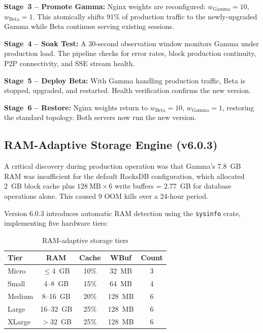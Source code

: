 \documentclass[11pt,a4paper,twocolumn]{article}
\begin{document}
\noindent\textbf{Stage~3 -- Promote Gamma:} Nginx weights are reconfigured:
$w_\text{Gamma} = 10$, $w_\text{Beta} = 1$. This atomically shifts 91\% of production
traffic to the newly-upgraded Gamma while Beta continues serving existing sessions.

\noindent\textbf{Stage~4 -- Soak Test:} A 30-second observation window monitors Gamma
under production load. The pipeline checks for error rates, block production continuity,
P2P connectivity, and SSE stream health.

\noindent\textbf{Stage~5 -- Deploy Beta:} With Gamma handling production traffic, Beta
is stopped, upgraded, and restarted. Health verification confirms the new version.

\noindent\textbf{Stage~6 -- Restore:} Nginx weights return to $w_\text{Beta} = 10$,
$w_\text{Gamma} = 1$, restoring the standard topology. Both servers now run the new
version.

\subsection{RAM-Adaptive Storage Engine (v6.0.3)}

A critical discovery during production operation was that Gamma's 7.8~GB RAM was
insufficient for the default RocksDB configuration, which allocated 2~GB block cache
plus $128~\text{MB} \times 6$ write buffers = 2.77~GB for database operations alone.
This caused 9 OOM kills over a 24-hour period.

Version 6.0.3 introduces automatic RAM detection using the \texttt{sysinfo} crate,
implementing five hardware tiers:

\begin{table}[H]
\centering
\caption{RAM-adaptive storage tiers}
\label{tab:ramtiers}
\scriptsize
\begin{tabularx}{\columnwidth}{lcccc}
\toprule
\textbf{Tier} & \textbf{RAM} & \textbf{Cache} & \textbf{WBuf} & \textbf{Count} \\
\midrule
Micro   & $\leq$4~GB  & 10\% & 32~MB  & 3 \\
Small   & 4--8~GB     & 15\% & 64~MB  & 4 \\
Medium  & 8--16~GB    & 20\% & 128~MB & 6 \\
Large   & 16--32~GB   & 25\% & 128~MB & 6 \\
XLarge  & $>$32~GB    & 25\% & 128~MB & 6 \\
\bottomrule
\end{tabularx}
\end{table}
\end{document}
